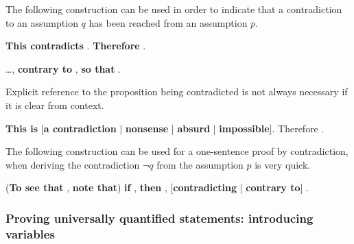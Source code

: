 \begin{vocabulary}
The following construction can be used in order to indicate that a contradiction to an assumption $q$ has been reached from an assumption $p$.

\begin{vocabtemplate}
\textbf{This contradicts} . \textbf{Therefore} .

\vtor

\dots{}, \textbf{contrary to} , \textbf{so that} .
\end{vocabtemplate}

Explicit reference to the proposition being contradicted is not always necessary if it is clear from context.

\begin{vocabtemplate}
\textbf{This is} [\textbf{a contradiction} | \textbf{nonsense} | \textbf{absurd} | \textbf{impossible}]. Therefore .
\end{vocabtemplate}
\end{vocabulary}

\todo{}


\begin{vocabulary}
The following construction can be used for a one-sentence proof by contradiction, when deriving the contradiction $\neg q$ from the assumption $p$ is very quick.

\begin{vocabtemplate}
(\textbf{To see that} , \textbf{note that}) \textbf{if} , \textbf{then} , [\textbf{contradicting} | \textbf{contrary to}] .
\end{vocabtemplate}
\end{vocabulary}

\subsubsection*{Proving universally quantified statements: introducing variables}

